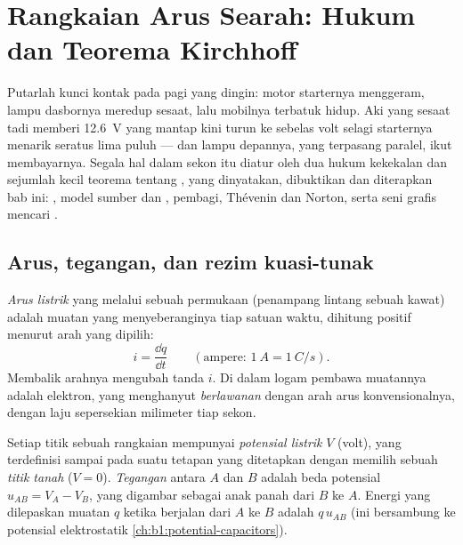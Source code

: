 \chapter{Rangkaian Arus Searah: Hukum dan Teorema Kirchhoff}\label{ch:b1:dc-circuits}

Putarlah kunci kontak pada pagi yang dingin: motor starternya
menggeram, lampu dasbornya meredup sesaat, lalu mobilnya terbatuk hidup.
Aki yang sesaat tadi memberi \qty{12.6}{V} yang mantap kini turun ke
sebelas volt selagi starternya menarik seratus lima puluh  --- dan
lampu depannya, yang terpasang paralel, ikut membayarnya. Segala hal
dalam sekon itu diatur oleh dua hukum kekekalan dan sejumlah kecil
teorema tentang , yang dinyatakan, dibuktikan dan
diterapkan bab ini: , model sumber dan , pembagi,
Thévenin dan Norton, serta seni grafis mencari .

\section{Arus, tegangan, dan rezim kuasi-tunak}

\begin{definition}\label{def:b1:dc-circuits:current}
\emph{Arus listrik} yang melalui sebuah permukaan (penampang lintang
sebuah kawat) adalah muatan yang menyeberanginya tiap satuan waktu,
dihitung positif menurut arah yang dipilih:
\[
i = \frac{\dd q}{\dd t} \qquad (\text{ampere: } \qty{1}{A} = \qty{1}{C/s}).
\]
Membalik arahnya mengubah tanda $i$. Di dalam logam pembawa muatannya
adalah elektron, yang menghanyut \emph{berlawanan} dengan arah arus
konvensionalnya, dengan laju sepersekian milimeter tiap sekon.
\end{definition}

\begin{definition}\label{def:b1:dc-circuits:voltage}
Setiap titik sebuah rangkaian mempunyai \emph{potensial listrik} $V$
(volt), yang terdefinisi sampai pada suatu tetapan yang ditetapkan
dengan memilih sebuah \emph{titik tanah} ($V = 0$). \emph{Tegangan}
antara $A$ dan $B$ adalah beda potensial $u_{AB} = V_A - V_B$, yang
digambar sebagai anak panah dari $B$ ke $A$. Energi yang dilepaskan
muatan $q$ ketika berjalan dari $A$ ke $B$ adalah $q\,u_{AB}$ (ini
bersambung ke potensial elektrostatik \cref{ch:b1:potential-capacitors}).
\end{definition}

